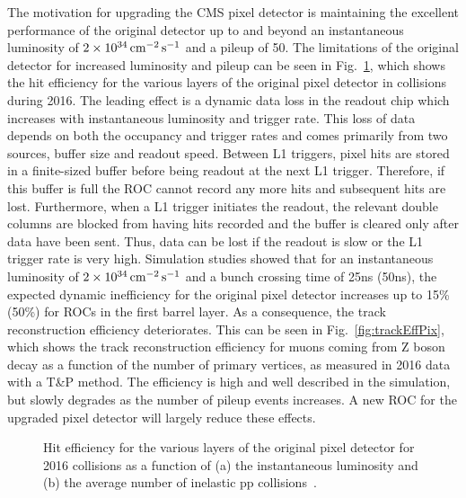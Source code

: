 The motivation for upgrading the CMS pixel detector is maintaining the excellent performance of the original detector up to and beyond an instantaneous luminosity of $2\times10^{34}\,\text{cm}^\text{$-$2}\,\text{s}^\text{$-$1}$ and a pileup of 50.
The limitations of the original detector for increased luminosity and pileup can be seen in Fig.~\ref{fig:PixEff}, which shows the hit efficiency for the various layers of the original pixel detector in collisions during 2016.
The leading effect is a dynamic data loss in the readout chip which increases with instantaneous luminosity and trigger rate. This loss of data depends on both the occupancy and trigger rates and comes primarily from two sources, buffer size and readout speed. Between L1 triggers, pixel hits are stored in a finite-sized buffer before being readout at the next L1 trigger. Therefore, if this buffer is full the ROC cannot record any more hits and subsequent hits are lost.
Furthermore, when a L1 trigger initiates the readout, the relevant double columns are blocked from having hits recorded and the buffer is cleared only after data have been sent.
Thus, data can be lost if the readout is slow or the L1 trigger rate is very high.
Simulation studies showed that for an instantaneous luminosity of $2\times10^{34}\,\text{cm}^\text{$-$2}\,\text{s}^\text{$-$1}$ and a bunch crossing time of 25\unit{ns} (50\unit{ns}),
the expected dynamic inefficiency for the original pixel detector increases up to 15\% (50\%) for ROCs in the first barrel layer.
As a consequence, the track reconstruction efficiency deteriorates. This can be seen in Fig.~\ref{fig:trackEffPix}, which shows the track reconstruction efficiency for muons coming from Z boson decay as a function of the number of primary vertices, as measured in 2016 data with a T\&P method. The efficiency is high and well described in the simulation, but slowly degrades as the number of pileup events increases.
A new ROC for the upgraded pixel detector will largely reduce these effects.\\

\begin{figure}[!htb]
 \begin{center}
 \end{center}
 \caption{Hit efficiency for the various layers of the original pixel detector for 2016 collisions as a function of (a) the instantaneous luminosity and (b) the average number of inelastic pp collisions~\cite{PixelOffline}.}
 \label{fig:PixEff}
\end{figure}

